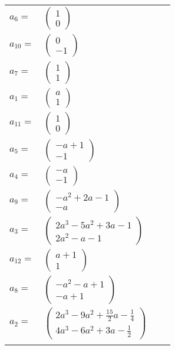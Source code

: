 \documentclass[1p]{elsarticle_modified}
\theoremstyle{definition}
\begin{document}
\begin{tabular}{m{7pt} m{180pt} m{7pt} m{180pt} }
\flushright $a_{6}=$&$\begin{pmatrix}1\\0\end{pmatrix}$ \\
\flushright $a_{10}=$&$\begin{pmatrix}0\\-1\end{pmatrix}$ \\
\flushright $a_{7}=$&$\begin{pmatrix}1\\1\end{pmatrix}$ \\
\flushright $a_{1}=$&$\begin{pmatrix}a\\1\end{pmatrix}$ \\
\flushright $a_{11}=$&$\begin{pmatrix}1\\0\end{pmatrix}$ \\
\flushright $a_{5}=$&$\begin{pmatrix}- a+1\\-1\end{pmatrix}$ \\
\flushright $a_{4}=$&$\begin{pmatrix}- a\\-1\end{pmatrix}$ \\
\flushright $a_{9}=$&$\begin{pmatrix}- a^2+2 a-1\\- a\end{pmatrix}$ \\
\flushright $a_{3}=$&$\begin{pmatrix}2 a^3-5 a^2+3 a-1\\2 a^2- a-1\end{pmatrix}$ \\
\flushright $a_{12}=$&$\begin{pmatrix}a+1\\1\end{pmatrix}$ \\
\flushright $a_{8}=$&$\begin{pmatrix}- a^2- a+1\\- a+1\end{pmatrix}$ \\
\flushright $a_{2}=$&$\begin{pmatrix}2 a^3-9 a^2+\frac{15}{2} a-\frac{1}{4}\\4 a^3-6 a^2+3 a-\frac{1}{2}\end{pmatrix}$\\&\end{tabular}
\end{document}
